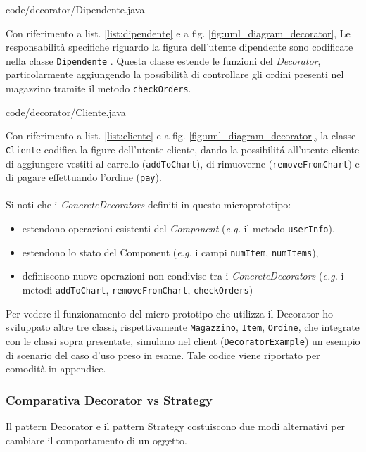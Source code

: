 \documentclass[12pt]{article}
\begin{document}

{code/decorator/Dipendente.java}

Con riferimento a list. \ref{list:dipendente} e a fig. \ref{fig:uml_diagram_decorator},
Le responsabilità specifiche riguardo la figura dell'utente dipendente
sono codificate nella classe {\tt Dipendente} \cite{gof_riferimento}. Questa classe estende le funzioni del {\em Decorator}, particolarmente aggiungendo la possibilità di controllare gli ordini presenti nel magazzino tramite il metodo {\tt checkOrders}.


{code/decorator/Cliente.java}

Con riferimento a list. \ref{list:cliente} e a fig. \ref{fig:uml_diagram_decorator}, la classe {\tt Cliente} codifica la figure dell'utente cliente, dando la possibilit\'a all'utente cliente di aggiungere vestiti al carrello ({\tt  addToChart}), di rimuoverne ({\tt removeFromChart}) e di pagare effettuando l'ordine ({\tt pay}).
\\
\\
Si noti che i {\em ConcreteDecorators} definiti in questo microprototipo:
\begin{itemize}
    \item estendono operazioni esistenti del {\em Component} ({\em e.g.} il metodo {\tt  userInfo}),
    \item estendono lo stato del Component ({\em e.g.} i campi {\tt numItem}, {\tt numItems}),
    \item definiscono nuove operazioni non condivise tra i {\em ConcreteDecorators} ({\em e.g.} i metodi {\tt addToChart}, {\tt removeFromChart}, {\tt checkOrders})
\end{itemize}

Per vedere il funzionamento del micro prototipo che utilizza il Decorator ho sviluppato altre tre classi, rispettivamente {\tt Magazzino}, {\tt Item}, {\tt Ordine}, che integrate con le classi sopra presentate, simulano nel client ({\tt DecoratorExample}) un esempio di scenario del caso d'uso preso in esame. Tale codice viene riportato per comodità in appendice.

\subsubsection{Comparativa Decorator vs Strategy}
Il pattern Decorator e il pattern Strategy costuiscono due modi alternativi per cambiare il comportamento di un oggetto.
\end{document}
